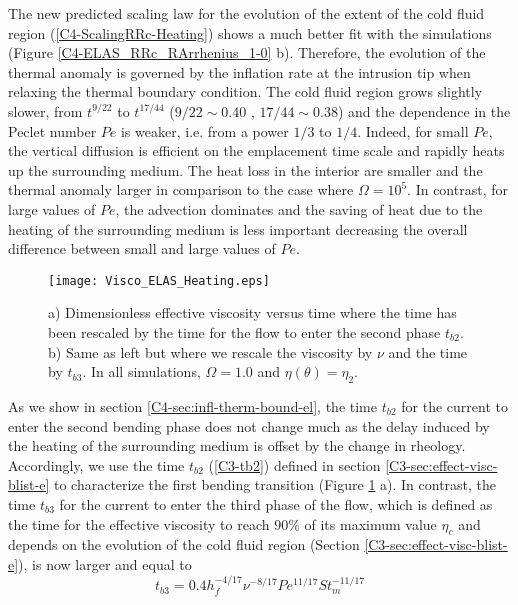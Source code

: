 The new predicted  scaling law for the evolution of  the extent of the
cold fluid  region (\ref{C4-ScalingRRc-Heating})  shows a  much better
fit  with  the  simulations  (Figure  \ref{C4-ELAS_RRc_RArrhenius_1-0}
b). Therefore, the evolution of the thermal anomaly is governed by the
inflation rate at the intrusion tip when relaxing the thermal boundary
condition.   The  cold  fluid   region  grows  slightly  slower,  from
$t^{9/22}$ to  $t^{17/44}$ ($9/22\sim 0.40$  , $17/44 \sim  0.38$) and
the dependence in the Peclet number  $Pe$ is weaker, i.e. from a power
$1/3$ to  $1/4$.  Indeed,  for small $Pe$,  the vertical  diffusion is
efficient  on the  emplacement time  scale  and rapidly  heats up  the
surrounding medium. The heat loss in  the interior are smaller and the
thermal anomaly larger in comparison to the case where $\Omega= 10^5$.
In contrast, for large values of $Pe$, the advection dominates and the
saving of  heat due to the  heating of the surrounding  medium is less
important decreasing  the overall  difference between small  and large
values of $Pe$.

\begin{figure}
  \begin{center}
    \graphicspath{ {/Users/thorey/Documents/These/Projet/Refroidissement/Skin_Model/Figure/Figure_Heating/} }
    \texttt{[image: Visco\_ELAS\_Heating.eps]}
    \caption{a)  Dimensionless effective  viscosity versus  time where
      the time has been rescaled by the time for the flow to enter the
      second phase $t_{b2}$. b) Same as  left but where we rescale the
      viscosity by $\nu$ and the time by $t_{b3}$. In all simulations,
      $\Omega=1.0$ and $\eta(\theta)=\eta_2$.}
    \label{C4-Visco_ELAS_Heating}
  \end{center}
\end{figure}

As  we  show  in section  \ref{C4-sec:infl-therm-bound-el},  the  time
$t_{b2}$ for  the current to enter  the second bending phase  does not
change much  as the delay  induced by  the heating of  the surrounding
medium is offset  by the change in rheology.  Accordingly,  we use the
time      $t_{b2}$     (\ref{C3-tb2})      defined     in      section
\ref{C3-sec:effect-visc-blist-e}  to  characterize the  first  bending
transition  (Figure \ref{C4-Visco_ELAS_Heating}  a). In  contrast, the
time $t_{b3}$  for the current to  enter the third phase  of the flow,
which is  defined as  the time  for the  effective viscosity  to reach
$90\%$ of its  maximum value $\eta_c$ and depends on  the evolution of
the cold  fluid region (Section  \ref{C3-sec:effect-visc-blist-e}), is
now larger and equal to
\begin{equation}
  t_{b3}=0.4h_f^{-4/17}\nu^{-8/17}Pe^{11/17}St_m^{-11/17}
  \label{C4-tb3}
\end{equation}

